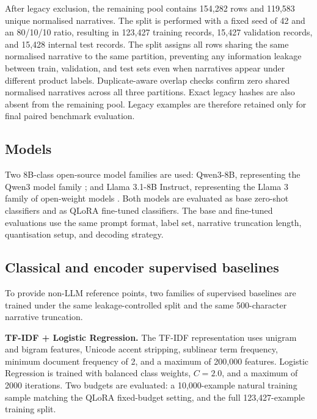 \documentclass{elektr}
\begin{document}
After legacy exclusion, the remaining pool contains 154,282 rows and 119,583 unique normalised narratives. The split is performed with a fixed seed of 42 and an 80/10/10 ratio, resulting in 123,427 training records, 15,427 validation records, and 15,428 internal test records. The split assigns all rows sharing the same normalised narrative to the same partition, preventing any information leakage between train, validation, and test sets even when narratives appear under different product labels. Duplicate-aware overlap checks confirm zero shared normalised narratives across all three partitions. Exact legacy hashes are also absent from the remaining pool. Legacy examples are therefore retained only for final paired benchmark evaluation.

\subsection{Models}

Two 8B-class open-source model families are used: Qwen3-8B, representing the Qwen3 model family \cite{yang2025qwen3}; and Llama 3.1-8B Instruct, representing the Llama 3 family of open-weight models \cite{dubey2024llama}.
Both models are evaluated as base zero-shot classifiers and as QLoRA fine-tuned classifiers. The base and fine-tuned evaluations use the same prompt format, label set, narrative truncation length, quantisation setup, and decoding strategy.

\subsection{Classical and encoder supervised baselines}

To provide non-LLM reference points, two families of supervised baselines are trained under the same leakage-controlled split and the same 500-character narrative truncation.

\textbf{TF-IDF + Logistic Regression.} The TF-IDF representation uses unigram and bigram features, Unicode accent stripping, sublinear term frequency, minimum document frequency of 2, and a maximum of 200,000 features. Logistic Regression is trained with balanced class weights, $C=2.0$, and a maximum of 2000 iterations. Two budgets are evaluated: a 10,000-example natural training sample matching the QLoRA fixed-budget setting, and the full 123,427-example training split.
\end{document}
